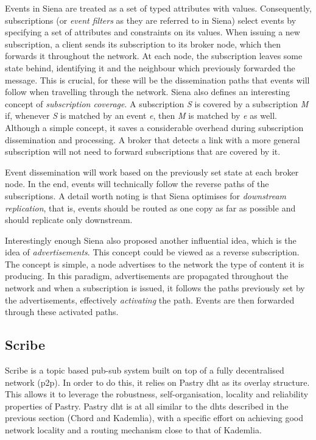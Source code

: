 Events in Siena are treated as a set of typed attributes with values.
Consequently, subscriptions (or \emph{event filters} as they are
referred to in Siena) select events by specifying a set of attributes
and constraints on its values. When issuing a new subscription, a client
sends its subscription to its broker node, which then forwards it
throughout the network. At each node, the subscription leaves some state
behind, identifying it and the neighbour which previously forwarded the
message. This is crucial, for these will be the dissemination paths that
events will follow when travelling through the network. Siena also
defines an interesting concept of \emph{subscription coverage}. A
subscription \emph{S} is covered by a subscription \emph{M} if, whenever
\emph{S} is matched by an event \emph{e}, then \emph{M} is matched by
\emph{e} as well. Although a simple concept, it saves a considerable
overhead during subscription dissemination and processing. A broker that
detects a link with a more general subscription will not need to forward
subscriptions that are covered by it.

Event dissemination will work based on the previously set state at each
broker node. In the end, events will technically follow the reverse paths
of the subscriptions. A detail worth noting is that Siena optimises for
\emph{downstream replication}, that is, events should be routed as one
copy as far as possible and should replicate only downstream.

Interestingly enough Siena also proposed another influential idea, which
is the idea of \emph{advertisements}. This concept could be viewed as a
reverse subscription. The concept is simple, a node advertises to the
network the type of content it is producing. In this paradigm,
advertisements are propagated throughout the network and when a
subscription is issued, it follows the paths previously set by the
advertisements, effectively \emph{activating} the path. Events are then
forwarded through these activated paths.

\subsection{Scribe}\label{scribe}

Scribe \cite{Castro2002} is a topic based pub-sub system built
on top of a fully decentralised network (\acrshort{p2p}). In order to do this, it
relies on Pastry \acrshort{dht} as its overlay structure. This allows it to
leverage the robustness, self-organisation, locality and reliability
properties of Pastry. Pastry \acrshort{dht} is at all similar to the \acrshort{dht}s described
in the previous section (Chord and Kademlia), with a specific effort on
achieving good network locality and a routing mechanism close to that of
Kademlia.

